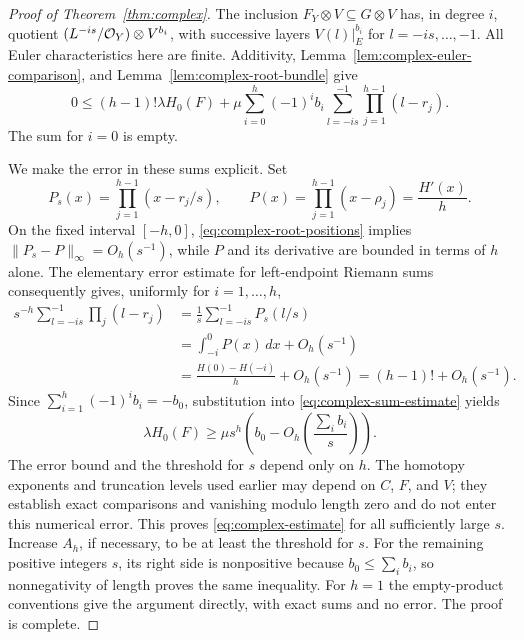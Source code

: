 \begin{proof}[Proof of Theorem~\ref{thm:complex}]
The inclusion $F_Y\otimes V\subseteq G\otimes V$ has, in degree $i$,
quotient $(L^{-is}/\mathcal O_Y)\otimes V^{b_i}$, with successive layers
$V(l)|_E^{b_i}$ for $l=-is,\ldots,-1$. All Euler characteristics here
are finite. Additivity, Lemma~\ref{lem:complex-euler-comparison}, and
Lemma~\ref{lem:complex-root-bundle} give
\begin{equation}\label{eq:complex-sum-estimate}
 0\leq (h-1)!\lambda H_0(F)
 +\mu\sum_{i=0}^h(-1)^i b_i
       \sum_{l=-is}^{-1}\prod_{j=1}^{h-1}(l-r_j).
\end{equation}
The sum for $i=0$ is empty.

We make the error in these sums explicit. Set
\[
 P_s(x)=\prod_{j=1}^{h-1}(x-r_j/s),\qquad
 P(x)=\prod_{j=1}^{h-1}(x-\rho_j)=\frac{H'(x)}h.
\]
On the fixed interval $[-h,0]$, \eqref{eq:complex-root-positions}
implies $\|P_s-P\|_\infty=O_h(s^{-1})$, while $P$ and its derivative
are bounded in terms of $h$ alone. The elementary error estimate for
left-endpoint Riemann sums consequently gives, uniformly for
$i=1,\ldots,h$,
\begin{align*}
 s^{-h}\sum_{l=-is}^{-1}\prod_j(l-r_j)
 &=\frac1s\sum_{l=-is}^{-1}P_s(l/s)\\
 &=\int_{-i}^0P(x)\,dx+O_h(s^{-1})\\
 &=\frac{H(0)-H(-i)}h+O_h(s^{-1})
  =(h-1)!+O_h(s^{-1}).
\end{align*}
Since $\sum_{i=1}^h(-1)^i b_i=-b_0$, substitution into
\eqref{eq:complex-sum-estimate} yields
\[
 \lambda H_0(F)\geq
 \mu s^h\left(b_0-O_h\left(\frac{\sum_i b_i}{s}\right)\right).
\]
The error bound and the threshold for $s$ depend only on $h$.
The homotopy exponents and truncation levels used earlier may depend on
$C$, $F$, and $V$; they establish exact comparisons and vanishing modulo
length zero and do not enter this numerical error. This proves
\eqref{eq:complex-estimate} for all sufficiently large $s$. Increase
$A_h$, if necessary, to be at least the threshold for $s$. For the
remaining positive integers $s$, its right side is nonpositive because
$b_0\leq\sum_i b_i$, so nonnegativity of length proves the same inequality.
For $h=1$ the empty-product conventions give the argument directly,
with exact sums and no error. The proof is complete.
\end{proof}
